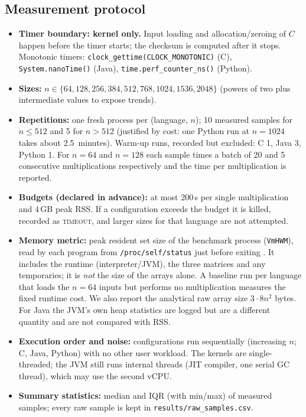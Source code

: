 \documentclass[10pt,a4paper]{article}
\begin{document}
\subsection{Measurement protocol}
\begin{itemize}
\item \textbf{Timer boundary: kernel only.} Input loading and allocation/zeroing of $C$ happen
before the timer starts; the checksum is computed after it stops. Monotonic timers:
\texttt{clock\_gettime(CLOCK\_MONOTONIC)} (C), \texttt{System.nanoTime()} (Java),
\texttt{time.perf\_counter\_ns()} (Python).
\item \textbf{Sizes:} $n\in\{64,128,256,384,512,768,1024,1536,2048\}$ (powers of two plus
intermediate values to expose trends).
\item \textbf{Repetitions:} one fresh process per (language, $n$); 10 measured samples for
$n\le512$ and 5 for $n>512$ (justified by cost: one Python run at $n=1024$ takes about
2.5~minutes). Warm-up runs, recorded but excluded: C 1, Java 3, Python 1. For $n=64$ and
$n=128$ each sample times a batch of 20 and 5 consecutive multiplications respectively and the
time per multiplication is reported.
\item \textbf{Budgets (declared in advance):} at most 200\,s per single multiplication and 4\,GB
peak RSS. If a configuration exceeds the budget it is killed, recorded as \textsc{timeout},
and larger sizes for that language are not attempted.
\item \textbf{Memory metric:} peak resident set size of the benchmark process (\texttt{VmHWM}),
read by each program from \texttt{/proc/self/status} just before exiting
\cite{proc5}. It includes the runtime (interpreter/JVM), the three matrices and any
temporaries; it is \emph{not} the size of the arrays alone. A baseline run per language that
loads the $n=64$ inputs but performs no multiplication measures the fixed runtime cost. We
also report the analytical raw array size $3\cdot8n^2$ bytes. For Java the JVM's own heap
statistics are logged but are a different quantity and are not compared with RSS.
\item \textbf{Execution order and noise:} configurations run sequentially (increasing $n$;
C, Java, Python) with no other user workload. The kernels are single-threaded; the JVM still
runs internal threads (JIT compiler, one serial GC thread), which may use the second vCPU.
\item \textbf{Summary statistics:} median and IQR (with min/max) of measured samples; every raw
sample is kept in \texttt{results/raw\_samples.csv}.
\end{itemize}
\end{document}
